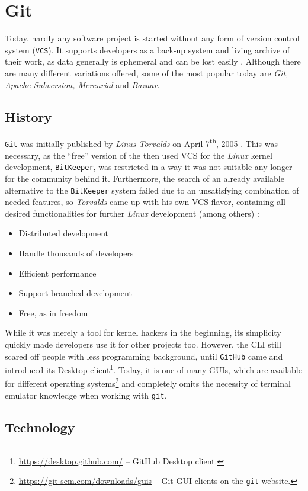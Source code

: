 \section{Git}
\label{sec:git}

Today, hardly any software project is started without any form of version control system (\texttt{VCS}). It supports developers as a back-up system and living archive of their work, as data generally is ephemeral and can be lost easily \cite[1]{loeliger2012version}. Although there are many different variations offered, some of the most popular today are \emph{Git, Apache Subversion, Mercurial} and \emph{Bazaar}.

\subsection{History}
\label{sec:git-history}
\texttt{Git} was initially published by \emph{Linus Torvalds} on April 7\textsuperscript{th}, 2005 \cite[6]{loeliger2012version}. This was necessary, as the ``free'' version of the then used VCS for the \emph{Linux} kernel development, \texttt{BitKeeper}, was restricted in a way it was not suitable any longer for the community behind it. Furthermore, the search of an already available alternative to the \texttt{BitKeeper} system failed due to an unsatisfying combination of needed features, so \emph{Torvalds} came up with his own VCS flavor, containing all desired functionalities for further \emph{Linux} development (among others) \cite[4]{loeliger2012version}:

\begin{itemize}
  \item Distributed development
  \item Handle thousands of developers
  \item Efficient performance
  \item Support branched development
  \item Free, as in freedom
\end{itemize}

While it was merely a tool for kernel hackers in the beginning, its simplicity quickly made developers use it for other projects too. However, the CLI still scared off people with less programming background, until \texttt{GitHub} came and introduced its Desktop client\footnote{\url{https://desktop.github.com/} -- GitHub Desktop client.}. Today, it is one of many GUIs, which are available for different operating systems\footnote{\url{https://git-scm.com/downloads/guis} -- Git GUI clients on the \texttt{git} website.} and completely omits the necessity of terminal emulator knowledge when working with \texttt{git}.


\subsection{Technology}
\label{sec:git-technology}
